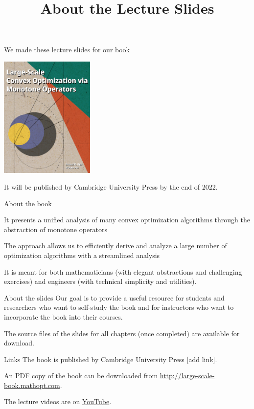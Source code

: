 \documentclass[10pt,mathserif]{beamer}
\title{\large \bfseries About the Lecture Slides}
\begin{document}
\frame{
\thispagestyle{empty}
\titlepage
}

\begin{frame}

We made these lecture slides for our book
\begin{center}
    \includegraphics[width=0.35\textwidth]{bookcover.jpg}
\end{center}


It will be published by Cambridge University Press by the end of 2022.

\end{frame}

\begin{frame}{About the book}

\begin{witemize}
    \item It presents a unified analysis of many  convex optimization algorithms through the abstraction of monotone operators
    \item The approach allows us to efficiently derive and analyze a large number of optimization algorithms with a streamlined analysis
    \item It is meant for both mathematicians (with elegant abstractions and challenging exercises) and engineers (with technical simplicity and utilities).
\end{witemize}
    
\end{frame}

\begin{frame}{About the slides}
  Our goal is to provide a useful resource for students and researchers who want to self-study the book and for instructors who want to incorporate the book into their courses.
  \bigskip
  
  The source files of the slides for all chapters (once completed) are available for download.
\end{frame}

\begin{frame}{Links}
The book is published by Cambridge University Press [add link]. 
\bigskip

An PDF copy of the book can be downloaded from \url{http://large-scale-book.mathopt.com}.
\bigskip

The lecture videos are on \href{https://www.youtube.com/channel/UC96YdKBAMKIHjfJMcKSOiLw/videos}{YouTube}.
    
\end{frame}
\end{document}
